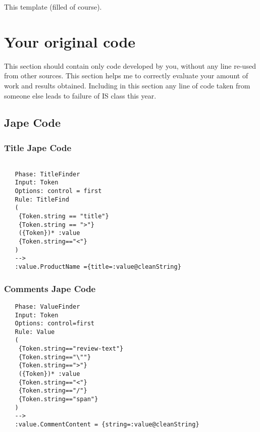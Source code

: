 \documentclass[a4paper,12pt]{report}
\begin{document}
This template (filled of course).


\appendix

\chapter{Your original code}

This section should contain only code developed by you, without any line re-used from other sources. 
This section helps me to correctly evaluate your amount of work and results obtained. 
Including in this section any line of code taken from someone else leads to failure of IS class this year.
\section{Jape Code}

\subsection{Title Jape Code}
\label{sec:jape1}
           
   \begin{verbatim}
     
   Phase: TitleFinder
   Input: Token
   Options: control = first
   Rule: TitleFind
   (
   	{Token.string == "title"}
   	{Token.string == ">"}
   	({Token})* :value
   	{Token.string=="<"}
   )
   -->
   :value.ProductName ={title=:value@cleanString} 
   \end{verbatim}

\subsection{Comments Jape Code}
\label{sec:jape2}
  \begin{verbatim}  
   Phase: ValueFinder
   Input: Token
   Options: control=first
   Rule: Value
   (
   	{Token.string=="review-text"}
   	{Token.string=="\""}
   	{Token.string==">"}
   	({Token})* :value
   	{Token.string=="<"}
   	{Token.string=="/"}
   	{Token.string=="span"}
   )
   -->
   :value.CommentContent = {string=:value@cleanString}
  \end{verbatim}

  
\end{document}
